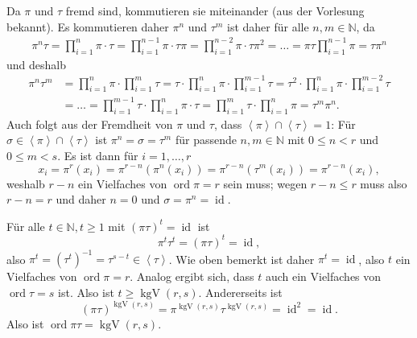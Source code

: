 \documentclass[a4paper,10pt]{article}
\theoremstyle{definition}
\newcommand{\N}{\mathbb{N}}
\newcommand{\id}{\operatorname{id}}
\newcommand{\ord}{\operatorname{ord}}
\newcommand{\kgV}{\operatorname{kgV}}
\newcommand{\gen}[1]{\left\langle#1\right\rangle}
\begin{document}
Da $\pi$ und $\tau$ fremd sind, kommutieren sie miteinander (aus der Vorlesung bekannt). Es kommutieren daher $\pi^n$ und $\tau^m$ ist daher für alle $n,m \in \N$, da
\begin{align*}
 \pi^n \tau
 = \prod_{i=1}^n \pi \cdot \tau
 = \prod_{i=1}^{n-1} \pi \cdot \tau \pi
 = \prod_{i=1}^{n-2} \pi \cdot \tau \pi^2
 = \ldots
 = \pi \tau \prod_{i=1}^{n-1} \pi
 = \tau \pi^n
\end{align*}
und deshalb
\begin{align*}
 \pi^n \tau^m
 &= \prod_{i=1}^n \pi \cdot \prod_{i=1}^m \tau
 = \tau \cdot \prod_{i=1}^n \pi \cdot \prod_{i=1}^{m-1} \tau
 = \tau^2 \cdot \prod_{i=1}^n \pi \cdot \prod_{i=1}^{m-2} \tau \\
 &= \ldots
 = \prod_{i=1}^{m-1} \tau \cdot \prod_{i=1}^n \pi \cdot \tau
 = \prod_{i=1}^m \tau \cdot \prod_{i=1}^n \pi
 = \tau^m \pi^n.
\end{align*}
Auch folgt aus der Fremdheit von $\pi$ und $\tau$, dass $\gen{\pi} \cap \gen{\tau} = 1$: Für $\sigma \in \gen{\pi} \cap \gen{\tau}$ ist $\pi^n = \sigma = \tau^m$ für passende $n,m \in \N$ mit $0 \leq n < r$ und $0 \leq m < s$. Es ist dann für $i=1,\ldots,r$
\[
 x_i = \pi^{r}(x_i) = \pi^{r-n}(\pi^n(x_i)) = \pi^{r-n}(\tau^m(x_i)) = \pi^{r-n}(x_i),
\]
weshalb $r-n$ ein Vielfaches von $\ord \pi = r$ sein muss; wegen $r-n \leq r$ muss also $r-n = r$ und daher $n=0$ und $\sigma = \pi^n = \id$.

Für alle $t \in \N, t \geq 1$ mit $(\pi \tau)^t = \id$ ist
\[
 \pi^t \tau^t = (\pi \tau)^t = \id,
\]
also $\pi^t = (\tau^t)^{-1} = \tau^{s-t} \in \gen{\tau}$. Wie oben bemerkt ist daher $\pi^t = \id$, also $t$ ein Vielfaches von $\ord \pi = r$. Analog ergibt sich, dass $t$ auch ein Vielfaches von $\ord \tau = s$ ist. Also ist $t \geq \kgV(r,s)$. Andererseits ist
\[
 (\pi \tau)^{\kgV(r,s)} = \pi^{\kgV(r,s)} \tau^{\kgV(r,s)} = \id^2 = \id.
\]
Also ist $\ord \pi\tau = \kgV(r,s)$.
\end{document}
